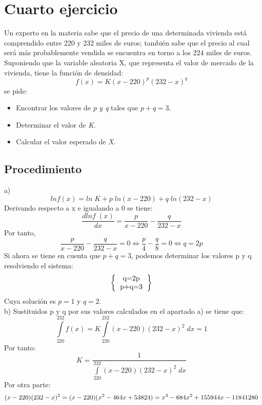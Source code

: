 \documentclass[12pt,letterpaper]{article}
\begin{document}
\newpage
\section{Cuarto ejercicio}
Un experto en la materia sabe que el precio de una determinada vivienda está comprendido entre 220 y 232 miles de euros; también sabe que el precio al cual será más probablemente vendida se encuentra en torno a los 224 miles de euros. Suponiendo que la variable aleatoria X, que representa el valor de mercado de la vivienda, tiene la función de densidad:
\begin{equation}
    f(x)=K(x-220)^p(232-x)^q
\end{equation}
se pide:
\begin{itemize}
    \item Encontrar los valores de \textit{p y q} tales que $p+q=3$.
    \item Determinar el valor de \textit{K}.
    \item Calcular el valor esperado de \textit{X}.\cite{ejercicios}
\end{itemize}
\subsection{Procedimiento}
a)
\begin{equation}
    ln f(x)=ln\; K +p\; ln(x-220)+q\; ln(232-x)
\end{equation}
Derivando respecto a x e igualando a 0 se tiene:
\begin{equation}
    \frac{dlnf\;(x)}{dx}=\frac{p}{x-220}-\frac{q}{232-x}
\end{equation}
Por tanto,
\begin{equation}
    \frac{p}{x-220}-\frac{q}{232-x}=0\Leftrightarrow \frac{p}{4}-\frac{q}{8}=0\Leftrightarrow q=2p
\end{equation}
Si ahora se tiene en cuenta que $p+q=3$, podemos determinar los valores p y q resolviendo el sistema:
\[ 
\left \{
  \begin{tabular}{ccc}
  q=2p\\
  p+q=3 
  \end{tabular}
\right \}
\]
Cuya solución es $p=1$ y $q=2$.\\
b) Sustituidos p y q por sus valores calculados en el apartado a) se tiene que:
\begin{equation}
    \int\limits_{220}^{232} f(x)=K \int\limits_{220}^{232}(x-220)(232-x)^2\;dx=1 
\end{equation}
Por tanto:
\begin{equation}
    K=\frac{1}{ \int\limits_{220}^{232}(x-220)(232-x)^2\;dx}
\end{equation}
Por otra parte:
\begin{equation}
    (x-220)(232-x)^2=(x-220)(x^2-464x+53824)\\=x^3-684x^2+155944x-11841280
\end{equation}
\end{document}
